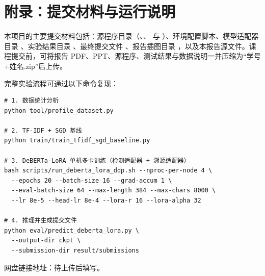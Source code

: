 \documentclass[UTF8,11pt,a4paper]{ctexart}
\begin{document}
\newpage



\newpage
\section{附录：提交材料与运行说明}

本项目的主要提交材料包括：源程序目录（、、 与 ）、环境配置脚本、模型适配器目录 、实验结果目录 、最终提交文件 、报告插图目录 ，以及本报告源文件。课程提交前，可将报告 PDF、PPT、源程序、测试结果与数据说明一并压缩为“学号+姓名.zip”后上传。

完整实验流程可通过以下命令复现：

\begin{verbatim}
# 1. 数据统计分析
python tool/profile_dataset.py

# 2. TF-IDF + SGD 基线
python train/train_tfidf_sgd_baseline.py

# 3. DeBERTa-LoRA 单机多卡训练（检测适配器 + 溯源适配器）
bash scripts/run_deberta_lora_ddp.sh --nproc-per-node 4 \
  --epochs 20 --batch-size 16 --grad-accum 1 \
  --eval-batch-size 64 --max-length 384 --max-chars 8000 \
  --lr 8e-5 --head-lr 8e-4 --lora-r 16 --lora-alpha 32

# 4. 推理并生成提交文件
python eval/predict_deberta_lora.py \
  --output-dir ckpt \
  --submission-dir result/submissions
\end{verbatim}

\noindent 网盘链接地址：待上传后填写。
\end{document}

